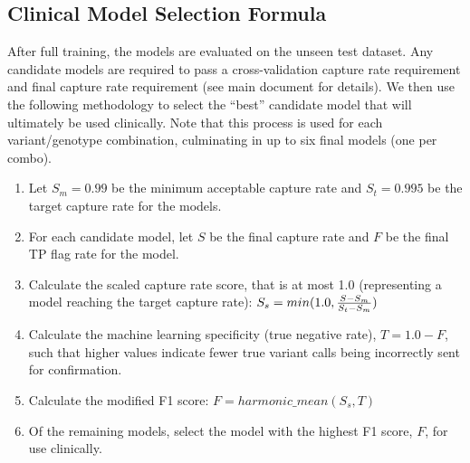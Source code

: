 \subsection{Clinical Model Selection Formula}
After full training, the models are evaluated on the unseen test dataset. 
Any candidate models are required to pass a cross-validation capture rate requirement and final capture rate requirement (see main document for details). 
We then use the following methodology to select the ``best'' candidate model that will ultimately be used clinically.  
Note that this process is used for each variant/genotype combination, culminating in up to six final models (one per combo).

\begin{enumerate}
    \item Let $S_m=0.99$ be the minimum acceptable capture rate and $S_t=0.995$ be the target capture rate for the models.
    \item For each candidate model, let $S$ be the final capture rate and $F$ be the final TP flag rate for the model.
    \item Calculate the scaled capture rate score, that is at most 1.0 (representing a model reaching the target capture rate): $S_s = min(1.0, {S - S_m \over S_t - S_m})$
    \item Calculate the machine learning specificity (true negative rate), $T = 1.0-F$, such that higher values indicate fewer true variant calls being incorrectly sent for confirmation.
    \item Calculate the modified F1 score: $F = harmonic\_mean(S_s, T)$
    \item Of the remaining models, select the model with the highest F1 score, $F$, for use clinically.
\end{enumerate}
